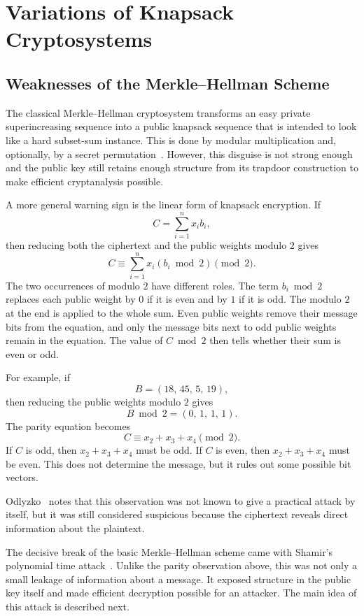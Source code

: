 \chapter{Variations of Knapsack Cryptosystems}

\section{Weaknesses of the Merkle--Hellman Scheme}

The classical Merkle--Hellman cryptosystem transforms an easy private
superincreasing sequence into a public knapsack sequence that is intended to
look like a hard subset-sum instance. This is done by modular multiplication
and, optionally, by a secret permutation~\cite{MerkleHellman1978}. However,
this disguise is not strong enough and the public key still retains enough
structure from its trapdoor construction to make efficient cryptanalysis
possible.

A more general warning sign is the linear form of knapsack encryption. If
\[
    C = \sum_{i=1}^{n} x_i b_i,
\]
then reducing both the ciphertext and the public weights modulo $2$ gives
\[
    C \equiv \sum_{i=1}^{n} x_i(b_i \bmod 2) \pmod{2}.
\]
The two occurrences of modulo $2$ have different roles. The term $b_i \bmod 2$
replaces each public weight by $0$ if it is even and by $1$ if it is odd. The
modulo $2$ at the end is applied to the whole sum. Even public weights remove
their message bits from the equation, and only the message bits next to odd
public weights remain in the equation. The value of $C\bmod 2$ then tells
whether their sum is even or odd.

For example, if
\[
    B=(18,\,45,\,5,\,19),
\]
then reducing the public weights modulo $2$ gives
\[
    B\bmod 2=(0,\,1,\,1,\,1).
\]
The parity equation becomes
\[
    C \equiv x_2+x_3+x_4 \pmod{2}.
\]
If $C$ is odd, then $x_2+x_3+x_4$ must be odd. If $C$ is even, then
$x_2+x_3+x_4$ must be even. This does not determine the message, but it rules
out some possible bit vectors.

Odlyzko~\cite{OdlyzkoRiseFall} notes that this observation was not known to
give a practical attack by itself, but it was still considered suspicious
because the ciphertext reveals direct information about the plaintext.

The decisive break of the basic Merkle--Hellman scheme came with Shamir's
polynomial time attack~\cite{Shamir1982}. Unlike the parity observation above,
this was not only a small leakage of information about a message. It exposed
structure in the public key itself and made efficient decryption possible for
an attacker. The main idea of this attack is described next.

